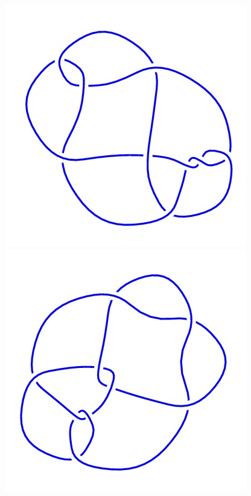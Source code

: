 \begin{figure}[H]
	\begin{minipage}[b]{.18\linewidth}
		\centering
		\includegraphics[width=\linewidth]{../data/9_21.png}
	\end{minipage}
	\begin{minipage}[b]{.18\linewidth}
		\centering
		\includegraphics[width=\linewidth]{../data/9_22.png}

\end{minipage}
\end{figure}
